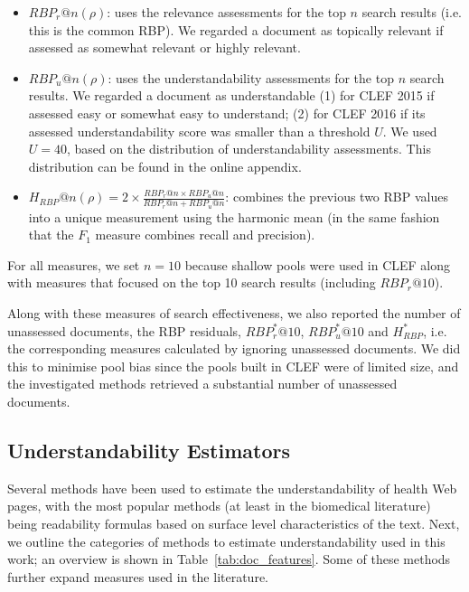 \begin{itemize}[leftmargin=*]
	\item $RBP_r@n(\rho)$: uses the relevance assessments for the top $n$ search results (i.e. this is the common RBP). We regarded a document as topically relevant if assessed as somewhat relevant or highly relevant.
	
    \item $RBP_u@n(\rho)$: uses the understandability assessments for the top $n$ search results. We regarded a document as understandable (1) for CLEF 2015 if assessed easy or somewhat easy to understand; (2) for CLEF 2016 if its assessed understandability score was smaller than a threshold $U$. We used $U = 40$, based on the distribution of understandability assessments. This distribution can be found in the online appendix.
	
    \item $H_{RBP}@n(\rho) = 2 \times \frac{RBP_r@n \times RBP_u@n}{RBP_r@n + RBP_u@n}$: combines the previous two RBP values into a unique measurement using the harmonic mean (in the same fashion that the $F_1$ measure combines recall and precision).
\end{itemize}

\noindent For all measures, we set $n=10$ because shallow pools were used in CLEF along with measures that focused on the top 10 search results (including $RBP_r@10$).

Along with these measures of search effectiveness, we also reported the number of unassessed documents, the RBP residuals,  $RBP^*_r@10$, $RBP^*_u@10$ and $H_{RBP}^*$, i.e. the corresponding measures calculated by ignoring unassessed documents. We did this to minimise pool bias since the pools built in CLEF were of limited size, and the investigated methods retrieved a substantial number of unassessed documents.


\subsection*{Understandability Estimators}
\label{sec:proxies}

Several methods have been used to estimate the understandability of health Web pages, with the most popular methods (at least in the biomedical literature) being readability formulas based on surface level characteristics of the text. Next, we outline the categories of methods to estimate understandability used in this work; an overview is shown in Table~\ref{tab:doc_features}. Some of these methods further expand measures used in the literature. 
 
